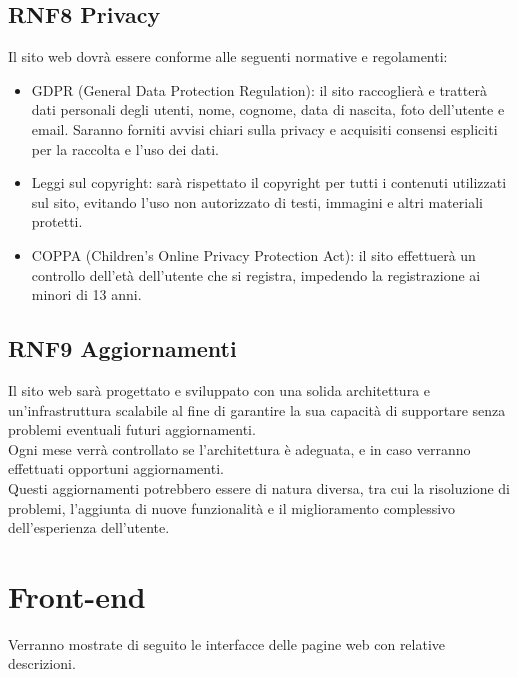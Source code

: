 \documentclass[a4paper,12pt]{article}
\begin{document}
\subsection*{RNF8 Privacy}
Il sito web dovrà essere conforme alle seguenti normative e regolamenti:
\begin{itemize}
    \item GDPR (General Data Protection Regulation): il sito raccoglierà e tratterà dati personali degli utenti, nome, cognome, data di nascita, foto dell'utente e email. Saranno forniti avvisi chiari sulla privacy e acquisiti consensi espliciti per la raccolta e l'uso dei dati.
    \item Leggi sul copyright: sarà rispettato il copyright per tutti i contenuti utilizzati sul sito, evitando l'uso non autorizzato di testi, immagini e altri materiali protetti.
    \item COPPA (Children's Online Privacy Protection Act): il sito effettuerà un controllo dell'età dell'utente che si registra, impedendo la registrazione ai minori di 13 anni.
\end{itemize}


\subsection*{RNF9 Aggiornamenti} 
Il sito web sarà progettato e sviluppato con una solida architettura e un'infrastruttura scalabile al fine di garantire la sua capacità di supportare senza problemi eventuali futuri aggiornamenti.\\
Ogni mese verrà controllato se l'architettura è adeguata, e in caso verranno effettuati opportuni aggiornamenti.\\
Questi aggiornamenti potrebbero essere di natura diversa, tra cui la risoluzione di problemi, l'aggiunta di nuove funzionalità e il miglioramento complessivo dell'esperienza dell'utente.
 


\newpage
\section{Front-end}
Verranno mostrate di seguito le interfacce delle pagine web con relative descrizioni.
\end{document}

